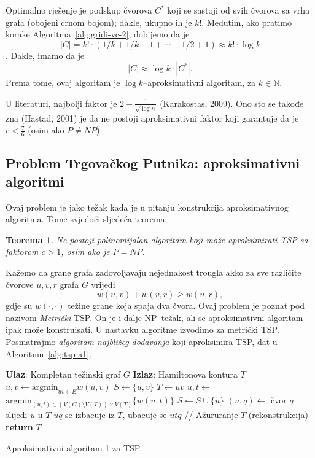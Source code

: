 \documentclass[a4paper, utf8, 11pt, colorlinks]{book}
\newtheorem{thm}{Teorema}
\begin{document}
  Optimalno rješenje je podskup čvorova $C^*$ koji se sastoji od svih čvorova sa vrha grafa (obojeni crnom bojom); dakle, ukupno ih je $k!$. Međutim, ako pratimo korake Algoritma~\ref{alg:gridi-vc-2}, dobijemo 
  da je $$|C| = k!\cdot( 1/k + 1/k-1 + \cdots + 1/2 + 1) \approx k! \cdot \log k$$. 
  Dakle, imamo da je
  $$   |C| \approx \log k \cdot |C^*|.$$ Prema tome, ovaj algoritam je $\log k$--aproksimativni algoritam, za $k \in \mathbb{N}$. 
  
  \noindent U literaturi, najbolji faktor je $2 - \frac{1}{\sqrt{\log n}}$ (Karakostas, 2009).
  Ono sto se takođe zna (Hastad, 2001) je da ne postoji aproksimativni faktor 
  koji garantuje da je $c < \frac{7}{6}$ (osim ako $P \neq NP$). 
  
  \subsection{Problem Trgovačkog Putnika: aproksimativni algoritmi}
  
  Ovaj problem je jako težak kada je u pitanju konstrukcija aproksimativnog algoritma. Tome svjedoči sljedeća teorema.
 \begin{thm}
    Ne postoji polinomijalan algoritam koji može aproksimirati TSP sa  faktorom $c > 1$, osim ako je $P = NP$. 
\end{thm}
  Kažemo da grane grafa zadovoljavaju nejednakost trougla akko za sve različite čvorove $u,v, r$ grafa $G$ vrijedi
  $$ w(u,v) + w(v,r) \geq w(u,r),$$
  gdje su $w(\cdot, \cdot)$ težine grane koja spaja dva čvora. Ovaj problem je poznat 
  pod nazivom \emph{Metrički} TSP. On je i dalje NP--težak, ali se aproksimativni algoritam ipak može konstruisati.  U nastavku algoritme izvodimo za metrički  TSP. Posmatrajmo \emph{algoritam najbližeg dodavanja} koji aproksimira TSP, dat u Algoritmu~\ref{alg:tsp-a1}. 
  
   \begin{algorithm}[!t] 
  
  	\begin{algorithmic}[1]
  		\STATE \textbf{Ulaz}: Kompletan težinski graf $G$
  		\STATE \textbf{Izlaz}: Hamiltonova kontura $T$  
  		\STATE $u,v \gets \mbox{argmin}_{uv \in E} w(u,v)$
  		\STATE $S \gets \{u,v\}$
  		\STATE $T \gets uv$
  		\STATE $u,t \gets$ $\mbox{argmin}_{(u,t) \in (V(G)\setminus V(T)) \times V(T)} \{w(u, t)\}$
  		\STATE $ S \gets S \cup \{u\}$ 
  		\STATE $(u, q)\gets$ čvor $q$ slijedi $u$ u  $T$
  		\STATE  $uq$ se izbacuje iz $T$, ubacuje se $utq$  // Ažururanje $T$ (rekonstrukcija)
  		\ENDWHILE
  		\STATE \textbf{return} $T$
  	\end{algorithmic}
   	\caption{Aproksimativni algoritam 1 za TSP.}
   	\label{alg:tsp-a1}
  \end{algorithm}
\end{document}
